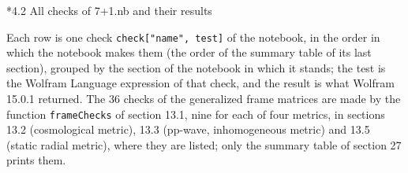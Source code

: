 \documentclass[10pt,a4paper]{article}
\makeatletter
\renewcommand\subsection{\@startsection{subsection}{2}{\z@}{-3.25ex\@plus -1ex \@minus -.2ex}{1.5ex \@plus .2ex}{\normalfont\large\bfseries\raggedright}}
\makeatother
\begin{document}
\subsection*{4.2 All checks of 7+1.nb and their results}
Each row is one check \texttt{check["name", test]} of the notebook, in the order in which the notebook makes them (the order of the summary table of its last section), grouped by the section of the notebook in which it stands; the test is the Wolfram Language expression of that check, and the result is what Wolfram 15.0.1 returned. The 36 checks of the generalized frame matrices are made by the function \texttt{frameChecks} of section 13.1, nine for each of four metrics, in sections 13.2 (cosmological metric), 13.3 (pp-wave, inhomogeneous metric) and 13.5 (static radial metric), where they are listed; only the summary table of section 27 prints them.
\end{document}
